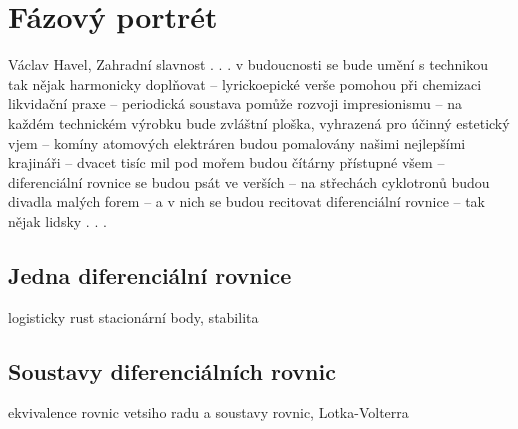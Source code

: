 \chapter{Fázový portrét}
\begin{chapquote}{Václav Havel, Zahradní slavnost}
  . . . v budoucnosti se bude umění s technikou tak nějak
harmonicky doplňovat – lyrickoepické verše pomohou při
chemizaci likvidační praxe – periodická soustava pomůže
rozvoji impresionismu – na každém technickém výrobku
bude zvláštní ploška, vyhrazená pro účinný estetický vjem
– komíny atomových elektráren budou pomalovány našimi nejlepšími krajináři – dvacet tisíc mil pod mořem
budou čítárny přístupné všem – diferenciální rovnice se
budou psát ve verších – na střechách cyklotronů budou
divadla malých forem – a v nich se budou recitovat diferenciální rovnice – tak nějak lidsky . . .
\end{chapquote}
\section{Jedna diferenciální rovnice}
\begin{Todo}
logisticky rust
stacionární body, stabilita
\end{Todo}
\section{Soustavy diferenciálních rovnic}
\begin{Todo}
	ekvivalence rovnic vetsiho radu a soustavy rovnic, Lotka-Volterra
\end{Todo}
